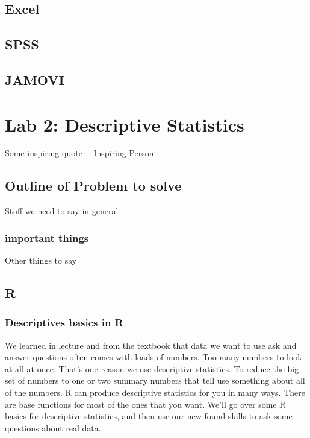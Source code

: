 \documentclass[]{book}
\theoremstyle{definition}
\theoremstyle{definition}
\theoremstyle{definition}
\theoremstyle{remark}
\begin{document}
\section{Excel}\label{excel}

\section{SPSS}\label{spss}

\section{JAMOVI}\label{jamovi}

\chapter{Lab 2: Descriptive
Statistics}\label{lab-2-descriptive-statistics}

{ Some inspiring quote ---Inspiring Person }

\section{Outline of Problem to solve}\label{outline-of-problem-to-solve}

Stuff we need to say in general

\subsection{important things}\label{important-things}

Other things to say

\section{R}\label{r-2}

\subsection{Descriptives basics in R}\label{descriptives-basics-in-r}

We learned in lecture and from the textbook that data we want to use ask
and answer questions often comes with loads of numbers. Too many numbers
to look at all at once. That's one reason we use descriptive statistics.
To reduce the big set of numbers to one or two summary numbers that tell
use something about all of the numbers. R can produce descriptive
statistics for you in many ways. There are base functions for most of
the ones that you want. We'll go over some R basics for descriptive
statistics, and then use our new found skills to ask some questions
about real data.
\end{document}
